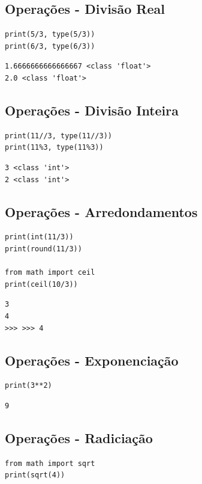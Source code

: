 \documentclass[presentation]{beamer}
\begin{document}
\subsection{Operações - Divisão Real}
\label{sec:orgheadline38}
\begin{verbatim}
print(5/3, type(5/3))
print(6/3, type(6/3))
\end{verbatim}

\begin{verbatim}
1.6666666666666667 <class 'float'>
2.0 <class 'float'>
\end{verbatim}
\subsection{Operações - Divisão Inteira}
\label{sec:orgheadline39}
\begin{verbatim}
print(11//3, type(11//3))
print(11%3, type(11%3))
\end{verbatim}

\begin{verbatim}
3 <class 'int'>
2 <class 'int'>
\end{verbatim}

\subsection{Operações - Arredondamentos}
\label{sec:orgheadline40}
\begin{verbatim}
print(int(11/3))
print(round(11/3))

from math import ceil
print(ceil(10/3))
\end{verbatim}

\begin{verbatim}
3
4
>>> >>> 4
\end{verbatim}

\subsection{Operações - Exponenciação}
\label{sec:orgheadline41}
\begin{verbatim}
print(3**2)
\end{verbatim}

\begin{verbatim}
9
\end{verbatim}
\subsection{Operações - Radiciação}
\label{sec:orgheadline42}
\begin{verbatim}
from math import sqrt
print(sqrt(4))
\end{verbatim}
\end{document}
